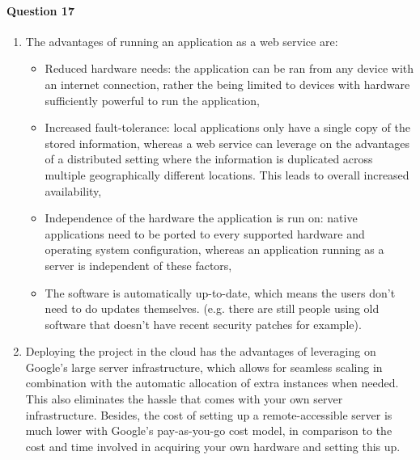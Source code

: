 \documentclass{ds-report}
\begin{document}
	\paragraph{Question 17} 
	\begin{enumerate}
		\item The advantages of running an application as a web service are:
		\begin{itemize}
			\item Reduced hardware needs: the application can be ran from any device with an internet connection, rather the being limited to devices with hardware sufficiently powerful to run the application,
			\item Increased fault-tolerance: local applications only have a single copy of the stored information, whereas a web service can leverage on the advantages of a distributed setting where the information is duplicated across multiple geographically different locations. This leads to overall increased availability,
			\item Independence of the hardware the application is run on: native applications need to be ported to every supported hardware and operating system configuration, whereas an application running as a server is independent of these factors, 
			\item The software is automatically up-to-date, which means the users don't need to do updates themselves. (e.g. there are still people using old software that doesn't have recent security patches for example).
		\end{itemize}
		\item Deploying the project in the cloud has the advantages of leveraging on Google's large server infrastructure, which allows for seamless scaling in combination with the automatic allocation of extra instances when needed. This also eliminates the hassle that comes with your own server infrastructure. Besides, the cost of setting up a remote-accessible server is much lower with Google's pay-as-you-go cost model, in comparison to the cost and time involved in acquiring your own hardware and setting this up.
	\end{enumerate}
	
\end{document}
